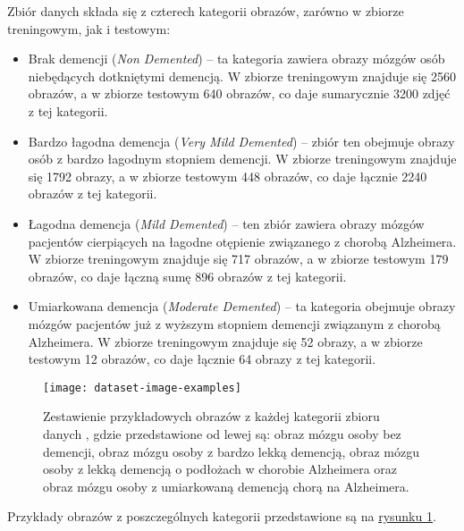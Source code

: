 Zbiór danych składa się z czterech kategorii obrazów, zarówno w zbiorze treningowym, jak i testowym:

\begin{itemize}

  \item
        Brak demencji (\emph{Non Demented}) -- ta kategoria zawiera obrazy mózgów osób niebędących dotkniętymi demencją.
        W zbiorze treningowym znajduje się 2560 obrazów, a w zbiorze testowym 640 obrazów, co daje sumarycznie 3200 zdjęć z tej kategorii.

  \item
        Bardzo łagodna demencja (\emph{Very Mild Demented}) -- zbiór ten obejmuje obrazy osób z bardzo łagodnym stopniem demencji.
        W zbiorze treningowym znajduje się 1792 obrazy, a w zbiorze testowym 448 obrazów, co daje łącznie 2240 obrazów z tej kategorii.

  \item
        Łagodna demencja (\emph{Mild Demented}) -- ten zbiór zawiera obrazy mózgów pacjentów cierpiących na łagodne otępienie związanego z chorobą Alzheimera.
        W zbiorze treningowym znajduje się 717 obrazów, a w zbiorze testowym 179 obrazów, co daje łączną sumę 896 obrazów z tej kategorii.

  \item
        Umiarkowana demencja (\emph{Moderate Demented}) -- ta kategoria obejmuje obrazy mózgów pacjentów już z wyższym stopniem demencji związanym z chorobą Alzheimera.
        W zbiorze treningowym znajduje się 52 obrazy, a w zbiorze testowym 12 obrazów, co daje łącznie 64 obrazy z tej kategorii.

\end{itemize}

\begin{figure}[ht]
  \texttt{[image: dataset-image-examples]}
  \caption[Zestawienie przykładowych obrazów z każdej kategorii zbioru danych]{Zestawienie przykładowych obrazów z każdej kategorii zbioru danych \cite{kaggle-alzheimers-dataset}, gdzie przedstawione od lewej są: obraz mózgu osoby bez demencji, obraz mózgu osoby z bardzo lekką demencją, obraz mózgu osoby z lekką demencją o podłożach w chorobie Alzheimera oraz obraz mózgu osoby z umiarkowaną demencją chorą na Alzheimera.}
  \label{fig:dataset-image-examples}
\end{figure}

Przykłady obrazów z poszczególnych kategorii przedstawione są na \hyperref[fig:dataset-image-examples]{rysunku \ref*{fig:dataset-image-examples}}.

